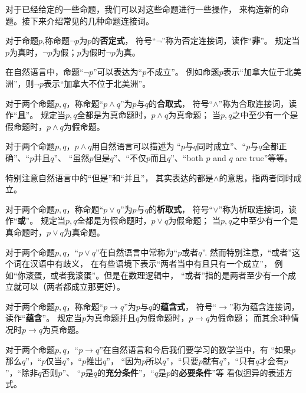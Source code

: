 对于已经给定的一些命题，我们可以对这些命题进行一些操作，
来构造新的命题。接下来介绍常见的几种命题连接词。

\begin{definition}[否定连接词]
对于命题$p$,称命题$\neg p$为$p$的\textbf{否定式}，
符号“$\neg$”称为否定连接词，读作“\textbf{非}”。
规定当$p$为真时，$\neg p$为假；$p$为假时$\neg p$为真。
\end{definition}
在自然语言中，命题“$\neg p$”可以表达为“$p$不成立”。
例如命题$p$表示“加拿大位于北美洲”，则$\neg p$表示“加拿大不位于北美洲”。

\begin{definition}[合取连接词]
对于两个命题$p,q$，称命题“$p\wedge q$”为$p$与$q$的\textbf{合取式}，
符号“$\wedge$”称为合取连接词，读作“\textbf{且}”。
规定当$p,q$全都是为真命题时，$p\wedge q$为真命题；
当$p,q$之中至少有一个是假命题时，$p\wedge q$为假命题。
\end{definition}
对于两个命题$p,q$，$p\wedge q$用自然语言可以描述为
“$p$与$q$同时成立”、“$p$与$q$全都正确”、“$p$并且$q$”、
“虽然$p$但是$q$”、“不仅$p$而且$q$”、“both $p$ and $q$ are true”等等。

特别注意自然语言中的“但是”和“并且”，
其实表达的都是$\wedge$的意思，指两者同时成立。

\begin{definition}[析取连接词]
对于两个命题$p,q$，称命题“$p\vee q$”为$p$与$q$的\textbf{析取式}，
符号“$\vee$”称为析取连接词，读作“\textbf{或}”。
规定当$p,q$全都是为假命题时，$p\vee q$为假命题；
当$p,q$之中至少有一个是真命题时，$p\vee q$为真命题。
\end{definition}
对于两个命题$p,q$，“$p\vee q$”在自然语言中常称为“$p$或者$q$”.
然而特别注意，“或者”这个词在汉语中有歧义，
在有些语境下表示“两者当中有且只有一个成立”，
例如“你滚蛋，或者我滚蛋”。但是在数理逻辑中，
“或者”指的是两者至少有一个成立就可以（两者都成立那更好）。

\begin{definition}[蕴含连接词]
对于两个命题$p,q$，称命题“$p\rightarrow q$”为$p$与$q$的\textbf{蕴含式}，
符号“$\rightarrow$”称为蕴含连接词，读作“\textbf{蕴含}”。
规定当$p$为真命题并且$q$为假命题时，$p\rightarrow q$为假命题；
而其余3种情况时$p\rightarrow q$为真命题。
\end{definition}

对于两个命题$p,q$，“$p\rightarrow q$”在自然语言和今后我们要学习的数学当中，有
“如果$p$那么$q$”，“$p$仅当$q$”，“$p$推出$q$”，
“因为$p$所以$q$”，“只要$p$就有$q$”，“只有$q$才会有$p$”，“除非$q$否则$p$”、
“$p$是$q$的\textbf{充分条件}”，“$q$是$p$的\textbf{必要条件}”等
看似迥异的表述方式。

